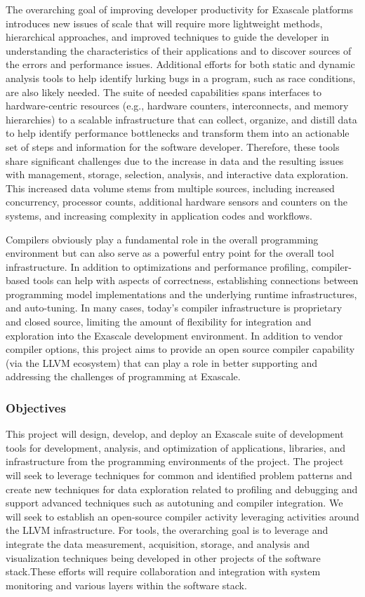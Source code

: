 The overarching goal of improving developer productivity for Exascale platforms introduces new issues of scale that will require more lightweight methods, hierarchical approaches, and improved techniques to guide the developer in understanding the characteristics of their applications and to discover sources of the errors and performance issues. Additional efforts for both static and dynamic analysis tools to help identify lurking bugs in a program, such as race conditions, are also likely needed. The suite of needed capabilities spans interfaces to hardware-centric resources (e.g., hardware counters, interconnects, and memory hierarchies) to a scalable infrastructure that can collect, organize, and distill data to help identify performance bottlenecks and transform them into an actionable set of steps and information for the software developer. Therefore, these tools share significant challenges due to the increase in data and the resulting issues with management, storage, selection, analysis, and interactive data exploration. This increased data volume stems from multiple sources, including increased concurrency, processor counts, additional hardware sensors and counters on the systems, and increasing complexity in application codes and workflows.

Compilers obviously play a fundamental role in the overall programming environment but can also serve as a powerful entry point for the overall tool infrastructure. In addition to optimizations and performance profiling, compiler-based tools can help with aspects of correctness, establishing connections between programming model implementations and the underlying runtime infrastructures, and auto-tuning. In many cases, today's compiler infrastructure is proprietary and closed source, limiting the amount of flexibility for integration and exploration into the Exascale development environment. In addition to vendor compiler options, this project aims to provide an open source compiler capability (via the LLVM ecosystem) that can play a role in better supporting and addressing the challenges of programming at Exascale. 


\subsubsection{Objectives}

This project will design, develop, and deploy an Exascale suite of development tools for development, analysis, and optimization of applications, libraries, and infrastructure from the programming environments of the project.  The project will seek to leverage techniques for common and identified problem patterns and create new techniques for data exploration related to profiling and debugging and support advanced techniques such as autotuning and compiler integration. We will seek to establish an open-source compiler activity leveraging activities around the LLVM infrastructure. For tools, the overarching goal is to leverage and integrate the data measurement, acquisition, storage, and analysis and visualization techniques being developed in other projects of the software stack.These efforts will require collaboration and integration with system monitoring and various layers within the software stack.


